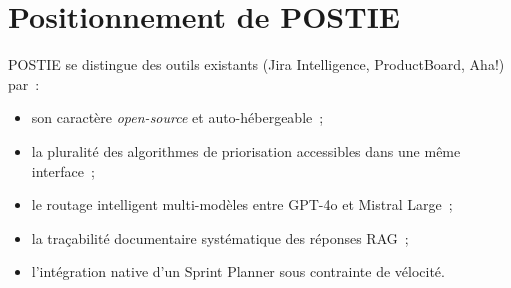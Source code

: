 \section{Positionnement de POSTIE}
POSTIE se distingue des outils existants (Jira Intelligence,
ProductBoard, Aha!) par~:
\begin{itemize}
  \item son caractère \emph{open-source} et auto-hébergeable~;
  \item la pluralité des algorithmes de priorisation accessibles dans
        une même interface~;
  \item le routage intelligent multi-modèles entre GPT-4o et
        Mistral Large~;
  \item la traçabilité documentaire systématique des réponses RAG~;
  \item l'intégration native d'un Sprint Planner sous contrainte de
        vélocité.
\end{itemize}
